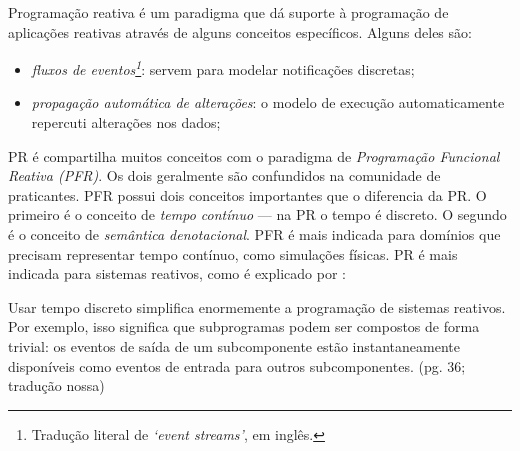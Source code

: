 Programação reativa é um paradigma que dá suporte à programação de aplicações
reativas através de alguns conceitos específicos.
Alguns deles são:

\begin{itemize}
\item \emph{fluxos de eventos\footnote{Tradução literal de \emph{‘event streams’}, em inglês.}}: servem para modelar notificações
discretas;
\item \emph{propagação automática de alterações}: o modelo de execução automaticamente
repercuti alterações nos dados;
\end{itemize}

PR é compartilha muitos conceitos com o paradigma de \emph{Programação Funcional
Reativa (PFR)}.
Os dois geralmente são confundidos na comunidade de praticantes.
PFR possui dois conceitos importantes que o diferencia da PR.
O primeiro é o conceito de \emph{tempo contínuo} — na PR o tempo é discreto.
O segundo é o conceito de \emph{semântica denotacional}.
PFR é mais indicada para domínios que precisam representar tempo contínuo,
como simulações físicas.
PR é mais indicada para sistemas reativos, como é explicado por
\textcite{roy2009}:

\begin{citacao}
  Usar tempo discreto simplifica enormemente a programação de sistemas reativos.
  Por exemplo, isso significa que subprogramas podem ser compostos de forma
  trivial: os eventos de saída de um subcomponente estão instantaneamente
  disponíveis como eventos de entrada para outros subcomponentes.
  (pg. 36; tradução nossa)
\end{citacao}
